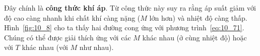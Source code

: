 \noindent

Đây chính là \textbf{công thức khí áp}. Từ công thức này suy ra rằng áp suất giảm với độ cao càng nhanh khi chất khí càng nặng ($M$ lớn hơn) và nhiệt độ càng thấp. Hình~\ref{fig:10_8} cho ta thấy hai đường cong ứng với phương trình~\eqref{eq:10_71}. Chúng có thể được giải thích ứng với các $M$ khác nhau (ở cùng nhiệt độ) hoặc với $T$ khác nhau (với $M$ như nhau).  